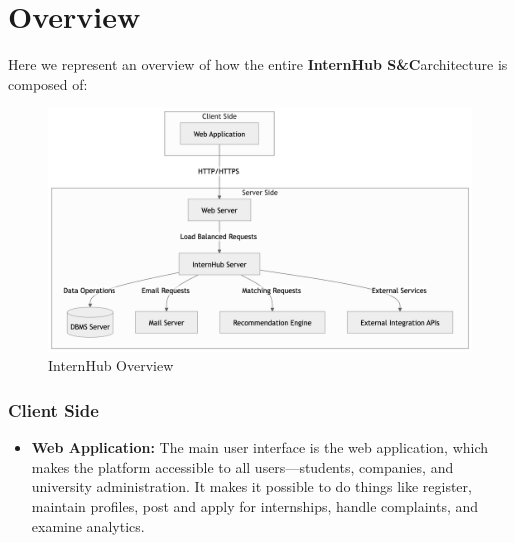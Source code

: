 \section{Overview}
\label{sec:overview}

Here we represent an overview of how the entire \textbf{InternHub S\&C}architecture is composed of:

\begin{figure}[H]
    \begin{center}
        \includegraphics[width=0.82\linewidth]{JhaBhatiaSharma/imagesDD/CKB Overview.png}
        \caption{InternHub Overview}
        \label{fig:internHubOverview}%
    \end{center}
\end{figure}


\subsubsection{Client Side}
\begin{itemize}
    \item \textbf{Web Application:} The main user interface is the web application, which makes the platform accessible to all users—students, companies, and university administration. It makes it possible to do things like register, maintain profiles, post and apply for internships, handle complaints, and examine analytics.
\end{itemize}

